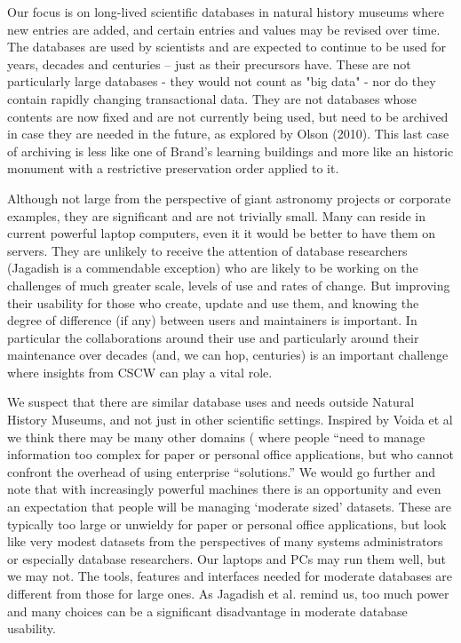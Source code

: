 Our focus is on long-lived scientific databases in natural history museums where new entries are added, and certain entries and values may be revised over time. The databases are used by scientists and are expected to continue to be used for years, decades and centuries – just as their precursors have. These are not particularly large databases - they would not count as "big data" - nor do they contain rapidly changing transactional data. They are not databases whose contents are now fixed and are not currently being used, but need to be archived in case they are  needed in the future, as explored by Olson (2010). This last case of archiving is less like one of Brand’s learning buildings and more like an historic monument with a restrictive preservation order applied to it.

Although not large from the perspective of giant astronomy projects or corporate examples, they are  significant and are not trivially small. Many can reside in current powerful laptop computers, even it it would be better to have them on servers. They are unlikely to receive the attention of database researchers (Jagadish is a commendable exception) who are likely to be working on the challenges of much greater scale, levels of use and rates of change. But improving their usability for those who create, update and use them, and knowing the degree of difference (if any) between users and maintainers is important. In particular the collaborations around their use and particularly around their maintenance over decades (and, we can hop, centuries) is an important challenge where insights from CSCW can play a vital role.

We suspect that there are similar database uses and needs outside Natural History Museums, and not just in other scientific settings. Inspired by Voida et al we think there may be  many other domains ( where people “need to manage information too complex for paper or personal office applications, but who cannot confront the overhead of using enterprise “solutions.” We would go further and note that with increasingly powerful machines there is an opportunity and even an expectation that people will be managing ‘moderate sized’ datasets. These are typically too large or unwieldy for paper or personal office applications, but look like very modest datasets from the perspectives of many systems administrators or especially database researchers. Our laptops and PCs may run them well, but we may not. The tools, features and interfaces needed for moderate databases are different from those for large ones. As Jagadish et al. remind us, too much power and many choices can be a significant disadvantage in moderate database usability.

